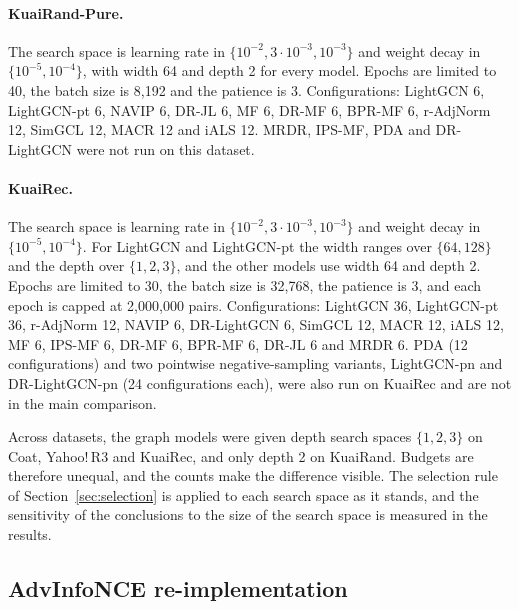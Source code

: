 \paragraph{KuaiRand-Pure.}
The search space is learning rate in $\{10^{-2},3\cdot10^{-3},10^{-3}\}$ and weight decay in $\{10^{-5},10^{-4}\}$, with
width 64 and depth 2 for every model. Epochs are limited to 40, the batch size is 8{,}192 and the patience is 3.
Configurations: LightGCN 6, LightGCN-pt 6, NAVIP 6, DR-JL 6, MF 6, DR-MF 6, BPR-MF 6, r-AdjNorm 12, SimGCL 12, MACR
12 and iALS 12. MRDR, IPS-MF, PDA and DR-LightGCN were not run on this dataset.

\paragraph{KuaiRec.}
The search space is learning rate in $\{10^{-2},3\cdot10^{-3},10^{-3}\}$ and weight decay in $\{10^{-5},10^{-4}\}$. For
LightGCN and LightGCN-pt the width ranges over $\{64,128\}$ and the depth over $\{1,2,3\}$, and the other models
use width 64 and depth 2. Epochs are limited to 30, the batch size is 32{,}768, the patience is 3, and each epoch
is capped at 2{,}000{,}000 pairs. Configurations: LightGCN 36, LightGCN-pt 36, r-AdjNorm 12, NAVIP 6,
DR-LightGCN 6, SimGCL 12, MACR 12, iALS 12, MF 6, IPS-MF 6, DR-MF 6, BPR-MF 6, DR-JL 6 and MRDR 6. PDA (12
configurations) and two pointwise negative-sampling variants, LightGCN-pn and DR-LightGCN-pn (24 configurations
each), were also run on KuaiRec and are not in the main comparison.

Across datasets, the graph models were given depth search spaces $\{1,2,3\}$ on Coat, Yahoo!\,R3 and KuaiRec, and only
depth 2 on KuaiRand. Budgets are therefore unequal, and the counts make the difference visible. The selection
rule of Section~\ref{sec:selection} is applied to each search space as it stands, and the sensitivity of the conclusions
to the size of the search space is measured in the results.

\subsection{AdvInfoNCE re-implementation}\label{sec:advsetup}

